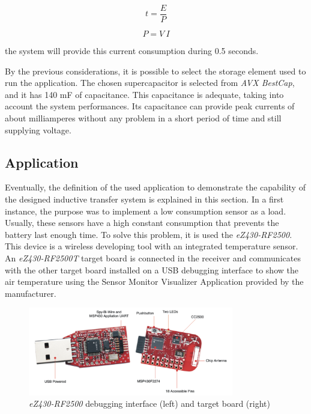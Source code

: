 \begin{equation*}
t = \frac{E}{P}  
\end{equation*} 

\begin{equation*}
P = V\:I
\end{equation*}
 
the system will provide this current consumption during 0.5 seconds.

By the previous considerations, it is possible to select the storage element used to run the application. The chosen supercapacitor is selected from \textit{AVX BestCap}, and it has 140 mF of capacitance. This capacitance is adequate, taking into account the system performances. Its capacitance can provide peak currents of about milliamperes without any problem in a short period of time and still supplying voltage.

\subsection{Application} \label{subsec:app}

Eventually, the definition of the used application to demonstrate the capability of the designed inductive transfer system is explained in this section. In a first instance, the purpose was to implement a low consumption sensor as a load. Usually, these sensors have a high constant consumption that prevents the battery last enough time. To solve this problem, it is used the \textit{eZ430-RF2500}. This device is a wireless developing tool with an integrated temperature sensor. An \textit{eZ430-RF2500T} target board is connected in the receiver and communicates with the other target board installed on a USB debugging interface to show the air temperature using the Sensor Monitor Visualizer Application provided by the manufacturer. 

\begin{figure}[htb]
\begin{center}
\includegraphics[width=0.8\textwidth]{./images/RF5000}
\caption{\textit{eZ430-RF2500} debugging interface (left) and target board (right)}
\end{center}
\end{figure}

